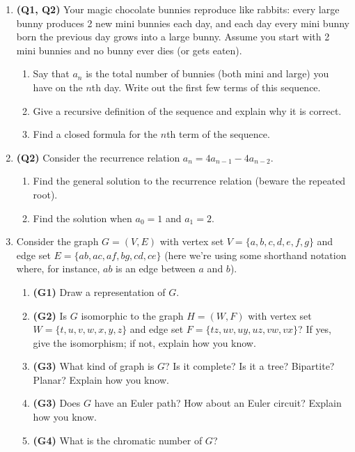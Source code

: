 \documentclass[12pt]{article}
\begin{document}
\begin{enumerate}
\item \textbf{(Q1, Q2)}  Your magic chocolate bunnies reproduce like rabbits: every large bunny produces 2 new mini bunnies each day, and each day every mini bunny born the previous day grows into a large bunny. Assume you start with 2 mini bunnies and no bunny ever dies (or gets eaten).
\begin{enumerate}
    \item Say that $a_n$ is the total number of bunnies (both mini and large) you have on the $n$th day. Write out the first few terms of this sequence.
    \item Give a recursive definition of the sequence and explain why it is correct. 
    \item Find a closed formula for the $n$th term of the sequence.
\end{enumerate}

\item \textbf{(Q2)} Consider the recurrence relation $a_n = 4a_{n-1} - 4a_{n-2}$.
\begin{enumerate}
    \item Find the general solution to the recurrence relation (beware the repeated root).
    
    \item Find the solution when $a_0 = 1$ and $a_1 = 2$.
    
\end{enumerate}

\item Consider the graph $G = (V, E)$ with vertex set $V = \{a,b,c,d,e,f,g\}$ and edge set $E = \{ab, ac, af, bg, cd, ce\}$ (here we're using some shorthand notation where, for instance, $ab$ is an edge between $a$ and $b$).

\begin{enumerate}
    \item \textbf{(G1)} Draw a representation of $G$.
    \item \textbf{(G2)} Is $G$ isomorphic to the graph $H = (W, F)$ with vertex set $W = \{t, u, v, w, x, y, z\}$ and edge set $F = \{tz, uv, uy, uz, vw, vx\}$? If yes, give the isomorphism; if not, explain how you know.
    \item \textbf{(G3)} What kind of graph is $G$? Is it complete? Is it a tree? Bipartite? Planar? Explain how you know.
    \item \textbf{(G3)} Does $G$ have an Euler path? How about an Euler circuit? Explain how you know.
    \item \textbf{(G4)} What is the chromatic number of $G$?
\end{enumerate}


\end{enumerate}
\end{document}
